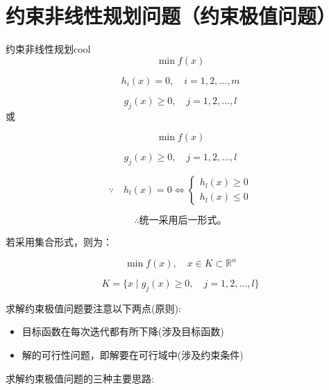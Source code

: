 \section{约束非线性规划问题（约束极值问题）}
\begin{thmbox}{约束非线性规划}{cool}
\[
\min f(x)
\]

\[
h_i(x) = 0, \quad i = 1, 2, \dots, m
\]

\[
g_j(x) \geq 0, \quad j = 1, 2, \dots, l
\]
或

\[
\min f(x)
\]

\[
g_j(x) \geq 0, \quad j = 1, 2, \dots, l
\]

\[\because
\quad h_l(x) = 0 \iff
\begin{cases}
h_l(x) \geq 0 \\
h_l(x) \leq 0
\end{cases}
\]

\[\therefore
\text{统一采用后一形式。}
\]

若采用集合形式，则为：

\[
\min f(x), \quad x \in K \subset \mathbb{R}^n
\]

\[
K = \{x \mid g_j(x) \geq 0, \quad j = 1, 2, \dots, l\}
\]
\end{thmbox}
求解约束极值问题要注意以下两点(原则):
\begin{itemize}
    \item 目标函数在每次迭代都有所下降(涉及目标函数)
    \item 解的可行性问题，即解要在可行域中(涉及约束条件)
\end{itemize}
求解约束极值问题的三种主要思路:
